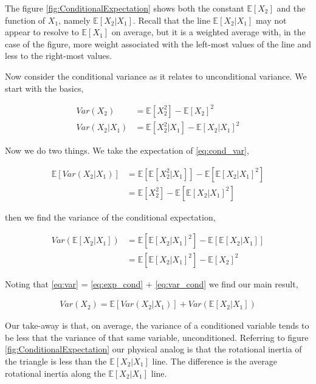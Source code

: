 The figure \ref{fig:ConditionalExpectation} shows both the constant $\mathbb{E}[X_2]$ and the function of $X_1$, namely $\mathbb{E}[X_2 | X_1]$. Recall that the line $\mathbb{E}[X_2 | X_1]$ may not appear to resolve to $\mathbb{E}[X_1]$ on average, but it is a weighted average with, in the case of the figure, more weight associated with the left-most values of the line and less to the right-most values.

Now consider the conditional variance as it relates to unconditional variance. We start with the basics,

\begin{align}
\label{eq:var}      Var(X_2)       &= \mathbb{E}[X_2^2] - \mathbb{E}[X_2]^2\\
\label{eq:cond_var} Var(X_2 | X_1) &=  \mathbb{E}[X_2^2 | X_1] - \mathbb{E}[X_2 | X_1]^2
\end{align}

Now we do two things. We take the expectation of \ref{eq:cond_var},

\begin{align}
\mathbb{E}[Var(X_2 | X_1)] 
&= \mathbb{E}[\mathbb{E}[X_2^2 | X_1]] - \mathbb{E}[\mathbb{E}[X_2 | X_1]^2]\\
\label{eq:exp_cond} &= \mathbb{E}[X_2^2] - \mathbb{E}[\mathbb{E}[X_2 | X_1]^2]
\end{align}

then we find the variance of the conditional expectation,

\begin{align}
Var(\mathbb{E}[X_2 | X_1]) 
&= \mathbb{E}[\mathbb{E}[X_2 | X_1]^2] - \mathbb{E}[\mathbb{E}[X_2 | X_1]]\\
\label{eq:var_cond} &= \mathbb{E}[\mathbb{E}[X_2 | X_1]^2] - \mathbb{E}[X_2]^2
\end{align}

Noting that \ref{eq:var} =  \ref{eq:exp_cond} + \ref{eq:var_cond} we find our main result,

\begin{align}
\boxed{
Var(X_2) = \mathbb{E}[Var(X_2 | X_1)] + Var(\mathbb{E}[X_2 | X_1])
}
\end{align}

Our take-away is that, on average, the variance of a conditioned variable tends to be less that the variance of that same variable, unconditioned. Referring to figure \ref{fig:ConditionalExpectation} our physical analog is that the rotational inertia of the triangle is less than the $\mathbb{E}[X_2 | X_1]$ line. The difference is the average rotational inertia along the $\mathbb{E}[X_2 | X_1]$ line.
